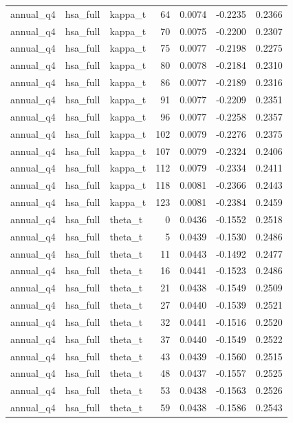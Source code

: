 \begin{tabular}{lllrrrr}
annual\_q4 & hsa\_full & kappa\_t & 64 & 0.0074 & -0.2235 & 0.2366 \\
annual\_q4 & hsa\_full & kappa\_t & 70 & 0.0075 & -0.2200 & 0.2307 \\
annual\_q4 & hsa\_full & kappa\_t & 75 & 0.0077 & -0.2198 & 0.2275 \\
annual\_q4 & hsa\_full & kappa\_t & 80 & 0.0078 & -0.2184 & 0.2310 \\
annual\_q4 & hsa\_full & kappa\_t & 86 & 0.0077 & -0.2189 & 0.2316 \\
annual\_q4 & hsa\_full & kappa\_t & 91 & 0.0077 & -0.2209 & 0.2351 \\
annual\_q4 & hsa\_full & kappa\_t & 96 & 0.0077 & -0.2258 & 0.2357 \\
annual\_q4 & hsa\_full & kappa\_t & 102 & 0.0079 & -0.2276 & 0.2375 \\
annual\_q4 & hsa\_full & kappa\_t & 107 & 0.0079 & -0.2324 & 0.2406 \\
annual\_q4 & hsa\_full & kappa\_t & 112 & 0.0079 & -0.2334 & 0.2411 \\
annual\_q4 & hsa\_full & kappa\_t & 118 & 0.0081 & -0.2366 & 0.2443 \\
annual\_q4 & hsa\_full & kappa\_t & 123 & 0.0081 & -0.2384 & 0.2459 \\
annual\_q4 & hsa\_full & theta\_t & 0 & 0.0436 & -0.1552 & 0.2518 \\
annual\_q4 & hsa\_full & theta\_t & 5 & 0.0439 & -0.1530 & 0.2486 \\
annual\_q4 & hsa\_full & theta\_t & 11 & 0.0443 & -0.1492 & 0.2477 \\
annual\_q4 & hsa\_full & theta\_t & 16 & 0.0441 & -0.1523 & 0.2486 \\
annual\_q4 & hsa\_full & theta\_t & 21 & 0.0438 & -0.1549 & 0.2509 \\
annual\_q4 & hsa\_full & theta\_t & 27 & 0.0440 & -0.1539 & 0.2521 \\
annual\_q4 & hsa\_full & theta\_t & 32 & 0.0441 & -0.1516 & 0.2520 \\
annual\_q4 & hsa\_full & theta\_t & 37 & 0.0440 & -0.1549 & 0.2522 \\
annual\_q4 & hsa\_full & theta\_t & 43 & 0.0439 & -0.1560 & 0.2515 \\
annual\_q4 & hsa\_full & theta\_t & 48 & 0.0437 & -0.1557 & 0.2525 \\
annual\_q4 & hsa\_full & theta\_t & 53 & 0.0438 & -0.1563 & 0.2526 \\
annual\_q4 & hsa\_full & theta\_t & 59 & 0.0438 & -0.1586 & 0.2543 \\

\end{tabular}
